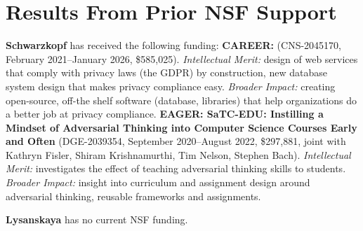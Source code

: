 %
%
%
%
%
%

\section{Results From Prior NSF Support}
\label{s:prior}

\textbf{Schwarzkopf} has received the following funding:
%
\textbf{CAREER: } (CNS-2045170, February 2021--January 2026, \$585,025).
%
\emph{Intellectual Merit:} design of web services that comply with privacy
laws (\eg the GDPR) by construction, new database system design that makes
privacy compliance easy.
%
\emph{Broader Impact:} creating open-source, off-the shelf software
(database, libraries) that help organizations do a better job at privacy
compliance.
%
\textbf{EAGER: SaTC-EDU: Instilling a Mindset of Adversarial Thinking into
Computer Science Courses Early and Often} (DGE-2039354,
September 2020--August 2022, \$297,881, joint with Kathryn Fisler, Shiram
Krishnamurthi, Tim Nelson, Stephen Bach).
%
\emph{Intellectual Merit:} investigates the effect of teaching adversarial
thinking skills to students.
%
\emph{Broader Impact:} insight into curriculum and assignment design
around adversarial thinking, reusable frameworks and assignments.
%

\textbf{Lysanskaya} has no current NSF funding.
%
